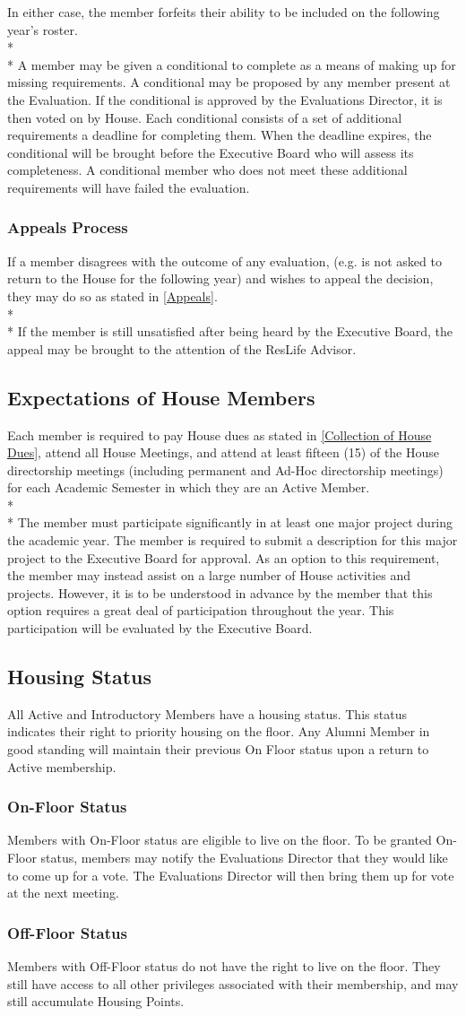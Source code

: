 \documentclass{article}
\newcommand{\bsection}[1]{\subsection{#1} \label{#1}}
\newcommand{\bsubsection}[1]{\subsubsection{#1} \label{#1}}
\begin{document}
In either case, the member forfeits their ability to be included on the following year’s roster.
\\* \\*
A member may be given a conditional to complete as a means of making up for missing requirements.
A conditional may be proposed by any member present at the Evaluation.
If the conditional is approved by the Evaluations Director, it is then voted on by House.
Each conditional consists of a set of additional requirements a deadline for completing them.
When the deadline expires, the conditional will be brought before the Executive Board who will assess its completeness.
A conditional member who does not meet these additional requirements will have failed the evaluation.
\bsubsection{Appeals Process}
If a member disagrees with the outcome of any evaluation, (e.g. is not asked to return to the House for the following year) and wishes to appeal the decision, they may do so as stated in \ref{Appeals}.
\\* \\*
If the member is still unsatisfied after being heard by the Executive Board, the appeal may be brought to the attention of the ResLife Advisor.

\bsection{Expectations of House Members}
Each member is required to pay House dues as stated in \ref{Collection of House Dues}, attend all House Meetings, and attend at least fifteen (15) of the House directorship meetings (including permanent and Ad-Hoc directorship meetings) for each Academic Semester in which they are an Active Member.
\\* \\*
The member must participate significantly in at least one major project during the academic year.
The member is required to submit a description for this major project to the Executive Board for approval.
As an option to this requirement, the member may instead assist on a large number of House activities and projects.
However, it is to be understood in advance by the member that this option requires a great deal of participation throughout the year.
This participation will be evaluated by the Executive Board.

\bsection{Housing Status}
All Active and Introductory Members have a housing status.
This status indicates their right to priority housing on the floor.
Any Alumni Member in good standing will maintain their previous On Floor status upon a return to Active membership.
\bsubsection{On-Floor Status}
Members with On-Floor status are eligible to live on the floor.
To be granted On-Floor status, members may notify the Evaluations Director that they would like to come up for a vote.
The Evaluations Director will then bring them up for vote at the next meeting.
\bsubsection{Off-Floor Status}
Members with Off-Floor status do not have the right to live on the floor.
They still have access to all other privileges associated with their membership, and may still accumulate Housing Points.
\end{document}
